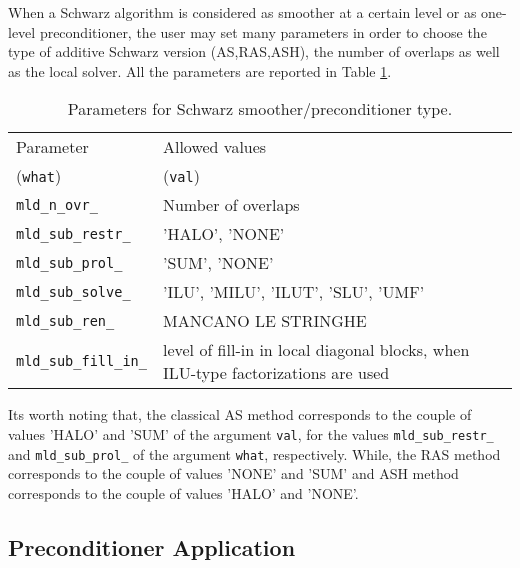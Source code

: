 When a Schwarz algorithm is considered as smoother at a certain level or as one-level preconditioner, the user may set many parameters 
in order to choose the type of additive Schwarz version (AS,RAS,ASH), the number of overlaps as well as the local solver. 
All the parameters are reported in Table \ref{tab:schwarz_type}.
\begin{table}[h]
{\small \label{tab:schwarz_type}
\begin{tabular}{ll}
Parameter & Allowed values\\
(\verb|what|) & (\verb|val|)\\
\verb|mld_n_ovr_|            & Number of overlaps \\
\verb|mld_sub_restr_|        & 'HALO', 'NONE'\\
\verb|mld_sub_prol_|         & 'SUM', 'NONE'\\
\verb|mld_sub_solve_|        & 'ILU', 'MILU', 'ILUT', 'SLU', 'UMF'\\
\verb|mld_sub_ren_|          & MANCANO LE STRINGHE\\
\verb|mld_sub_fill_in_|      & level of fill-in in local diagonal blocks, when ILU-type factorizations are used\\
\end{tabular}
\caption{Parameters for Schwarz smoother/preconditioner type.}
}
\end{table}
Its worth noting that, the classical AS method corresponds to the couple of values 'HALO' and 'SUM' of the argument \verb|val|, 
for the values \verb|mld_sub_restr_| and \verb|mld_sub_prol_| of the argument \verb|what|, respectively. While, the RAS method corresponds to 
the couple of values 'NONE' and 'SUM' and ASH method corresponds to the couple of values 'HALO' and 'NONE'.

\subsection{Preconditioner Application} \label{sec:application}

